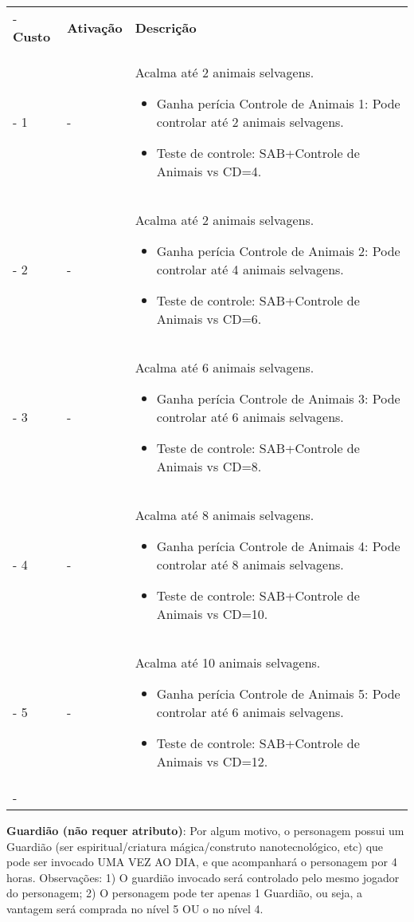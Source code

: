 \begin{small}
	\begin{tabu}{|X[c]|X[c]|X[3]|} \tabucline-
		\textbf{Custo} 	& \textbf{Ativação}	&	\textbf{Descrição} \\ \tabucline-
		1	& 	-		& Acalma até 2 animais selvagens.
							\begin{itemize}
								\item Ganha perícia Controle de Animais 1: Pode controlar até 2 animais selvagens.
								\item Teste de controle: SAB+Controle de Animais vs CD=4.
							\end{itemize} \\ \tabucline-
		2	& 	-		& Acalma até 2 animais selvagens.
							\begin{itemize}
								\item Ganha perícia Controle de Animais 2: Pode controlar até 4 animais selvagens.
								\item Teste de controle: SAB+Controle de Animais vs CD=6.
							\end{itemize} \\ \tabucline-
		3	& 	-		& Acalma até 6 animais selvagens.
							\begin{itemize}
								\item Ganha perícia Controle de Animais 3: Pode controlar até 6 animais selvagens.
								\item Teste de controle: SAB+Controle de Animais vs CD=8.
							\end{itemize} \\ \tabucline-
		4	& 	-		& Acalma até 8 animais selvagens.
							\begin{itemize}
								\item Ganha perícia Controle de Animais 4: Pode controlar até 8 animais selvagens.
								\item Teste de controle: SAB+Controle de Animais vs CD=10.
							\end{itemize} \\ \tabucline-
		5	& 	-		& Acalma até 10 animais selvagens.
							\begin{itemize}
								\item Ganha perícia Controle de Animais 5: Pode controlar até 6 animais selvagens.
								\item Teste de controle: SAB+Controle de Animais vs CD=12.
							\end{itemize} \\ \tabucline- 
	\end{tabu}


\textbf{Guardião (não requer atributo)}: Por algum motivo, o personagem possui um Guardião (ser espiritual/criatura mágica/construto nanotecnológico, etc) que pode ser invocado UMA VEZ AO DIA, e que acompanhará o personagem por 4 horas. Observações: 1) O guardião invocado será controlado pelo mesmo jogador do personagem; 2) O personagem pode ter apenas 1 Guardião, ou seja, a vantagem será comprada no nível 5 OU o no nível 4.


\end{small}
